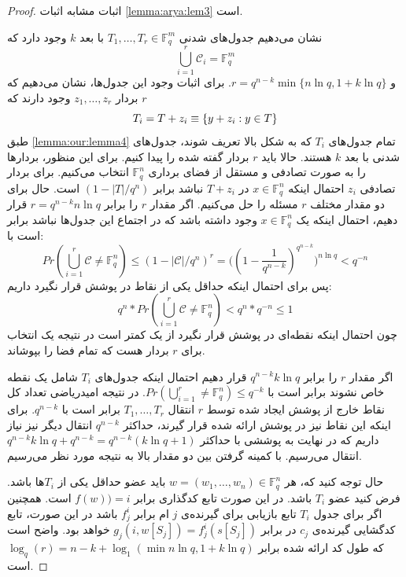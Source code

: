 \begin{proof}
	اثبات مشابه اثبات
	\autoref{lemma:arya:lem3}
	است.
	
	نشان می‌دهیم جدول‌های شدنی
	$T_1, \ldots, T_r \in \mathbb{F}_q^m$
	با بعد
	$k$
	وجود دارد که
	\begin{equation}
		\bigcup_{i = 1}^r \mathcal{C}_i = \mathbb{F}_q^m
	\end{equation}
	و 
	$r = q^{n - k} \min{ \{n \ln q, 1 + k \ln q\}} $.
	برای اثبات وجود این جدول‌ها، نشان می‌دهیم که
	$r$
	بردار
	$z_1, \dots, z_r$
	وجود دارند که
	\begin{equation}
		T_i = T + z_i \equiv \left\{ y + z_i: y \in T \right\}
	\end{equation}
	طبق
	\autoref{lemma:our:lemma4}
	تمام جدول‌های
	$T_i$
	که به شکل بالا تعریف شوند، جدول‌های شدنی	با بعد
	$k$
	هستند.	 حالا باید $r$ بردار گفته شده را پیدا کنیم. برای این منظور، بردارها را به صورت تصادفی و مستقل از فضای برداری
	$\mathbb{F}_q^n$
	انتخاب می‌کنیم. برای بردار تصادفی
	$z_i$
	احتمال اینکه 
	$x \in \mathbb{F}_q^n$
	در
	$T + z_i$
	نباشد برابر
	$ (1 - |T|/q^n)$
	است. حال برای دو مقدار مختلف
	$r$
	مسئله را حل می‌کنیم.
	 اگر مقدار
	$r$
	را برابر
	$r = q^{n - k} n \ln q $
	قرار دهیم، احتمال اینکه یک
		$x \in \mathbb{F}_q^n$
	وجود داشته باشد که در اجتماع این جدول‌ها نباشد برابر است با:
		\begin{equation}
			Pr(\bigcup_{i = 1}^{r} \mathcal{C} \ne \mathbb{F}_q^n) \leq  (1 - |\mathcal{C}|/q^n)^{r}  = \big((1 - \dfrac{1}{q^{n - k}})^{q^{n - k}} \big)^{n \ln q} < q^{-n}
			\end{equation}
	پس برای احتمال اینکه حداقل یکی از نقاط در پوشش قرار نگیرد داریم:
	$$q^n * Pr(\bigcup_{i = 1}^{r} \mathcal{C} \ne \mathbb{F}_q^n) < q^n * q^{-n} \leq 1$$
	چون احتمال اینکه نقطه‌ای در پوشش قرار نگیرد از یک کمتر است در نتیجه یک انتخاب برای
	$r$
	بردار هست که تمام فضا را بپوشاند.
	
	اگر مقدار
	$r$
	را برابر
	$q^{n - k} k \ln q$
	قرار دهیم احتمال اینکه جدول‌های
	$T_i$
	شامل یک نقطه خاص نشوند برابر است با
	$Pr(\bigcup_{i = 1}^{r} \ne \mathbb{F}_q^n) \leq q^{- k}$.
	در نتیجه امیدریاضی تعداد کل نقاط خارج از پوشش ایجاد شده توسط
	$r$
	انتقال
	$T_1, \ldots, T_r$
	برابر است با
	$q^{n - k}$.
	برای اینکه این نقاط نیز در پوشش ارائه شده قرار گیرند، حداکثر 
	$q^{n - k}$
	انتقال دیگر نیز نیاز داریم که در نهایت به پوششی با حداکثر
	$q^{n - k} k \ln q + q^{n - k} = q^{n - k}(k \ln q + 1)$
	انتقال می‌رسیم.		 	  	 
	با کمینه گرفتن بین دو مقدار بالا به نتیجه مورد نظر می‌رسیم.
	
	حال توجه کنید که، هر
	$w = (w_1, \dots, w_n) \in \mathbb{F}_q^n$
	باید عضو حداقل یکی از
	$T_i$ها
	باشد. فرض کنید عضو
	$T_i$
	باشد. در این صورت تابع کدگذاری
	\picod
	برابر
	$f(w)) = i$
	است. همچنین اگر برای جدول
	$T_i$
	تابع بازیابی برای گیرنده‌ی
	$j$
	ام برابر
	$f_j^i$
	باشد در این صورت، تابع کدگشایی گیرنده‌ی
	$c_j$
	در
	\picod
	برابر
	$g_j(i, w[S_j]) = f_j^i(s[S_j])$
	خواهد بود.
	واضح است که طول کد 
	\picod
	ارائه شده برابر
	$\log_q(r) = n - k + \log_1(\min{n \ln q, 1 + k \ln q})$
	است.
\end{proof}
